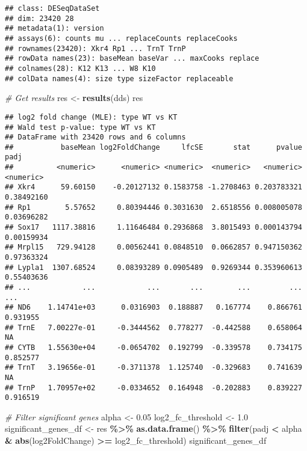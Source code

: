 \documentclass[
]{article}
\newenvironment{Shaded}{\begin{snugshade}}{\end{snugshade}}
\newcommand{\CommentTok}[1]{\textcolor[rgb]{0.56,0.35,0.01}{\textit{#1}}}
\newcommand{\FloatTok}[1]{\textcolor[rgb]{0.00,0.00,0.81}{#1}}
\newcommand{\FunctionTok}[1]{\textcolor[rgb]{0.13,0.29,0.53}{\textbf{#1}}}
\newcommand{\NormalTok}[1]{#1}
\newcommand{\OtherTok}[1]{\textcolor[rgb]{0.56,0.35,0.01}{#1}}
\newcommand{\SpecialCharTok}[1]{\textcolor[rgb]{0.81,0.36,0.00}{\textbf{#1}}}
\begin{document}
\begin{verbatim}
## class: DESeqDataSet 
## dim: 23420 28 
## metadata(1): version
## assays(6): counts mu ... replaceCounts replaceCooks
## rownames(23420): Xkr4 Rp1 ... TrnT TrnP
## rowData names(23): baseMean baseVar ... maxCooks replace
## colnames(28): K12 K13 ... W8 K10
## colData names(4): size type sizeFactor replaceable
\end{verbatim}

\begin{Shaded}
\begin{Highlighting}[]
\CommentTok{\# Get results}
\NormalTok{res }\OtherTok{\textless{}{-}} \FunctionTok{results}\NormalTok{(dds)}
\NormalTok{res}
\end{Highlighting}
\end{Shaded}

\begin{verbatim}
## log2 fold change (MLE): type WT vs KT 
## Wald test p-value: type WT vs KT 
## DataFrame with 23420 rows and 6 columns
##           baseMean log2FoldChange     lfcSE       stat      pvalue       padj
##          <numeric>      <numeric> <numeric>  <numeric>   <numeric>  <numeric>
## Xkr4      59.60150    -0.20127132 0.1583758 -1.2708463 0.203783321 0.38492160
## Rp1        5.57652     0.80394446 0.3031630  2.6518556 0.008005078 0.03696282
## Sox17   1117.38816     1.11646484 0.2936868  3.8015493 0.000143794 0.00159934
## Mrpl15   729.94128     0.00562441 0.0848510  0.0662857 0.947150362 0.97363324
## Lypla1  1307.68524     0.08393289 0.0905489  0.9269344 0.353960613 0.55403636
## ...            ...            ...       ...        ...         ...        ...
## ND6    1.14741e+03      0.0316903  0.188887   0.167774    0.866761   0.931955
## TrnE   7.00227e-01     -0.3444562  0.778277  -0.442588    0.658064         NA
## CYTB   1.55630e+04     -0.0654702  0.192799  -0.339578    0.734175   0.852577
## TrnT   3.19656e-01     -0.3711378  1.125740  -0.329683    0.741639         NA
## TrnP   1.70957e+02     -0.0334652  0.164948  -0.202883    0.839227   0.916519
\end{verbatim}

\begin{Shaded}
\begin{Highlighting}[]
\CommentTok{\# Filter significant genes}
\NormalTok{alpha }\OtherTok{\textless{}{-}} \FloatTok{0.05}
\NormalTok{log2\_fc\_threshold }\OtherTok{\textless{}{-}} \FloatTok{1.0}
\NormalTok{significant\_genes\_df }\OtherTok{\textless{}{-}}\NormalTok{ res }\SpecialCharTok{\%\textgreater{}\%}
  \FunctionTok{as.data.frame}\NormalTok{() }\SpecialCharTok{\%\textgreater{}\%}
  \FunctionTok{filter}\NormalTok{(padj }\SpecialCharTok{\textless{}}\NormalTok{ alpha }\SpecialCharTok{\&} \FunctionTok{abs}\NormalTok{(log2FoldChange) }\SpecialCharTok{\textgreater{}=}\NormalTok{ log2\_fc\_threshold)}
\NormalTok{significant\_genes\_df}
\end{Highlighting}
\end{Shaded}
\end{document}
